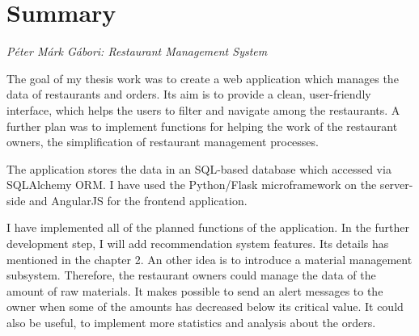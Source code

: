 \documentclass[a4paper,12pt]{article}
\begin{document}
\pagestyle{empty}

\section*{Summary}

\textit{Péter Márk Gábori: Restaurant Management System}

\bigskip

The goal of my thesis work was to create a web application which manages the data of restaurants and orders. Its aim is to provide a clean, user-friendly interface, which helps the users to filter and navigate among the restaurants. A further plan was to implement functions for helping the work of the restaurant owners, the simplification of restaurant management processes.

The application stores the data in an SQL-based database which accessed via SQLAlchemy ORM. I have used the Python/Flask microframework on the server-side and AngularJS for the frontend application.

I have implemented all of the planned functions of the application. In the further development step, I will add recommendation system features. Its details has mentioned in the chapter 2. An other idea is to introduce a material management subsystem. Therefore, the restaurant owners could manage the data of the amount of raw materials. It makes possible to send an alert messages to the owner when some of the amounts has decreased below its critical value. It could also be useful, to implement more statistics and analysis about the orders.
\end{document}
